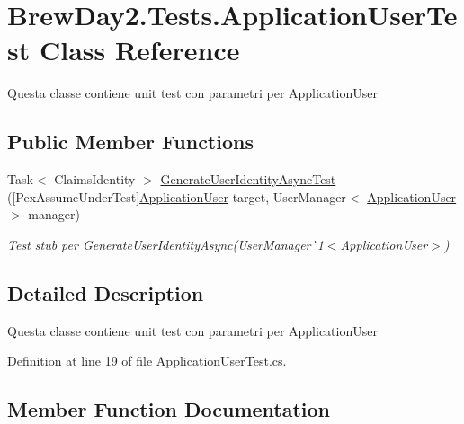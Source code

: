 \hypertarget{class_brew_day2_1_1_tests_1_1_application_user_test}{}\section{Brew\+Day2.\+Tests.\+Application\+User\+Test Class Reference}
\label{class_brew_day2_1_1_tests_1_1_application_user_test}


Questa classe contiene unit test con parametri per Application\+User 


\subsection*{Public Member Functions}
\begin{DoxyCompactItemize}
\item 
Task$<$ Claims\+Identity $>$ \mbox{\hyperlink{class_brew_day2_1_1_tests_1_1_application_user_test_ac1eea783c7a1e9a0c5cec3d8238eca1d}{Generate\+User\+Identity\+Async\+Test}} (\mbox{[}Pex\+Assume\+Under\+Test\mbox{]}\mbox{\hyperlink{class_brew_day2_1_1_models_1_1_application_user}{Application\+User}} target, User\+Manager$<$ \mbox{\hyperlink{class_brew_day2_1_1_models_1_1_application_user}{Application\+User}} $>$ manager)
\begin{DoxyCompactList}\small\item\em Test stub per Generate\+User\+Identity\+Async(User\+Manager\`{}1$<$Application\+User$>$)\end{DoxyCompactList}\end{DoxyCompactItemize}


\subsection{Detailed Description}
Questa classe contiene unit test con parametri per Application\+User



Definition at line 19 of file Application\+User\+Test.\+cs.



\subsection{Member Function Documentation}
\mbox{\label{class_brew_day2_1_1_tests_1_1_application_user_test_ac1eea783c7a1e9a0c5cec3d8238eca1d}} 
